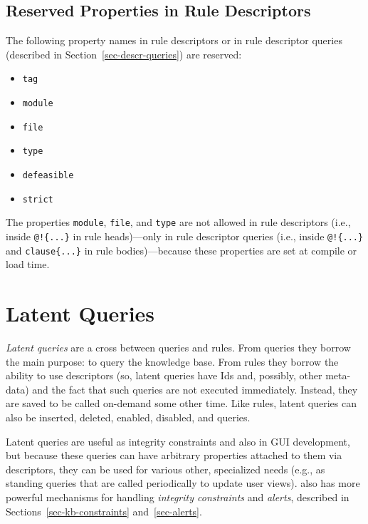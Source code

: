 \documentclass[11pt]{article}
\newcommand{\ERGO}{\mbox{\smaller{\ensuremath{\cal{E}}\smaller{{\sc{RGO}}}}}\xspace}
\begin{document}
\subsection{Reserved Properties in Rule Descriptors}

The following property names in rule descriptors or in rule descriptor
queries (described in Section~\ref{sec-descr-queries}) are reserved:
\begin{itemize}
\item  \texttt{tag}
\item  \texttt{module}
\item  \texttt{file}
\item  \texttt{type}
\item \texttt{defeasible}
\item \texttt{strict}  
\end{itemize}
The properties \texttt{module}, \texttt{file}, and \texttt{type}  are not allowed in rule
descriptors (i.e., inside \texttt{@!\{...\}} in rule heads)---only in rule descriptor queries (i.e.,
inside \texttt{@!\{...\}} and \texttt{clause\{...\}} in rule
bodies)---because these properties are set
at compile or load time.  


\section{Latent Queries}
\label{sec-latent-query}

\emph{Latent queries} are a cross between queries and rules. From queries  
they borrow the main purpose: to query the knowledge base. From rules
they borrow the ability to use descriptors (so, latent queries have Ids and,
possibly, other meta-data) and the fact that such queries are not
executed immediately. Instead, they are saved to be called on-demand some
other time. Like rules, latent queries can also be inserted, deleted,
enabled, disabled, and queries.

Latent queries are useful as integrity constraints and also in GUI
development, but because these queries can have arbitrary properties
attached to them via descriptors, they can be used for various other,
specialized needs (e.g., as standing queries that are called periodically
to update user views).
\ERGO also has more
powerful mechanisms for handling \emph{integrity constraints} and
\emph{alerts}, described in Sections~\ref{sec-kb-constraints}
and~\ref{sec-alerts}.
\end{document}
